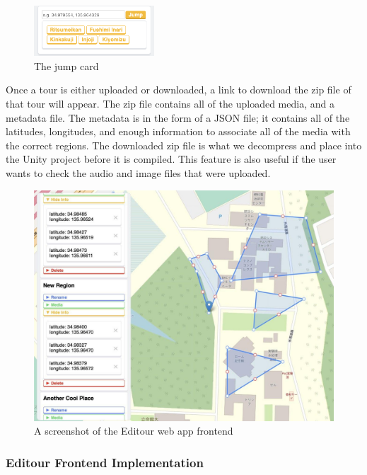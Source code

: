 \documentclass[a4paper, 10pt, american, titlepage]{article}
\begin{document}
\begin{figure}[h]
	\centering
    \includegraphics[width=0.4\textwidth]{jump-card-editour.png}
    \caption{The jump card}
	\label{fig:jumpCard}
\end{figure}

Once a tour is either uploaded or downloaded, a link to download the zip file of
that tour will appear. The zip file contains all of the uploaded media, and a
metadata file. The metadata is in the form of a JSON file; it contains all of
the latitudes, longitudes, and enough information to associate all of the media
with the correct regions. The downloaded zip file is what we decompress and
place into the Unity project before it is compiled. This feature is also useful
if the user wants to check the audio and image files that were uploaded.

\begin{figure}[h]
	\centering
	\includegraphics[width=\textwidth]{editour.jpg}
	\caption{A screenshot of the Editour web app frontend}
	\label{fig:editour}
\end{figure}

\subsubsection{Editour Frontend Implementation}
\label{sec:editourFrontendImplementation}
\end{document}
